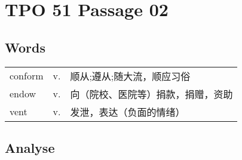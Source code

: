 \section{TPO 51 Passage 02}

\subsection{Words}

\begin{tabular}{lll}
    conform & v. & 顺从;遵从;随大流，顺应习俗    \\
    endow   & v. & 向（院校、医院等）捐款，捐赠，资助 \\
    vent    & v. & 发泄，表达（负面的情绪）      \\
\end{tabular}

\subsection{Analyse}

